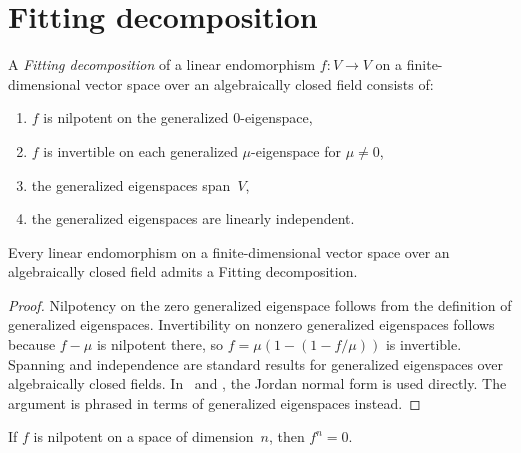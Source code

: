 \section{Fitting decomposition}

\begin{definition}\label{def:fitting_decomp}
    \leanok
    A \emph{Fitting decomposition} of a linear endomorphism
    $f : V \to V$ on a finite-dimensional vector space over an
    algebraically closed field consists of:
    \begin{enumerate}
        \item $f$ is nilpotent on the generalized $0$-eigenspace,
        \item $f$ is invertible on each generalized $\mu$-eigenspace
              for $\mu \neq 0$,
        \item the generalized eigenspaces span~$V$,
        \item the generalized eigenspaces are linearly independent.
    \end{enumerate}
\end{definition}

\begin{theorem}\label{thm:fitting_decomp}
    \leanok
    Every linear endomorphism on a finite-dimensional vector space
    over an algebraically closed field admits a Fitting decomposition.
\end{theorem}

\begin{proof}
    \leanok
    Nilpotency on the zero generalized eigenspace follows from
    the definition of generalized eigenspaces.
    Invertibility on nonzero generalized eigenspaces follows
    because $f - \mu$ is nilpotent there, so $f = \mu(1 - (1-f/\mu))$
    is invertible.
    Spanning and independence are standard results for
    generalized eigenspaces over algebraically closed fields.
    In~\cite{Sanz2010Quantum} and \cite[Lemma~6.3(b)]{Wolf2012Quantum},
    the Jordan normal form is used directly.
    The argument is phrased in terms of generalized
    eigenspaces instead.
\end{proof}

\begin{theorem}\label{thm:nilpotent_pow_bound}
    \leanok
    If $f$ is nilpotent on a space of dimension~$n$,
    then $f^n = 0$.
\end{theorem}

